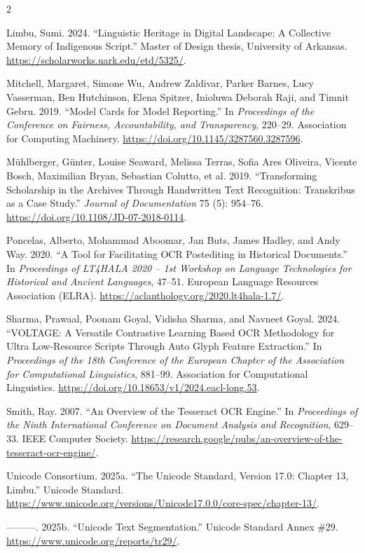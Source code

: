 \documentclass[
  10pt,
]{article}
\newlength{\cslhangindent}
\newenvironment{CSLReferences}[2] %
 {\begin{list}{}{%
  \setlength{\itemindent}{0pt}
  \setlength{\leftmargin}{0pt}
  \setlength{\parsep}{0pt}
  \ifodd #1
   \setlength{\leftmargin}{\cslhangindent}
   \setlength{\itemindent}{-1\cslhangindent}
  \fi
  \setlength{\itemsep}{#2\baselineskip}}}
 {\end{list}}
\begin{document}
\begin{multicols}{2}
\begin{CSLReferences}{1}{0}
Limbu, Sumi. 2024. {``Linguistic Heritage in Digital Landscape: A
Collective Memory of Indigenous Script.''} Master of Design thesis,
University of Arkansas. \url{https://scholarworks.uark.edu/etd/5325/}.

Mitchell, Margaret, Simone Wu, Andrew Zaldivar, Parker Barnes, Lucy
Vasserman, Ben Hutchinson, Elena Spitzer, Inioluwa Deborah Raji, and
Timnit Gebru. 2019. {``Model Cards for Model Reporting.''} In
\emph{Proceedings of the Conference on Fairness, Accountability, and
Transparency}, 220--29. Association for Computing Machinery.
\url{https://doi.org/10.1145/3287560.3287596}.

Mühlberger, Günter, Louise Seaward, Melissa Terras, Sofia Ares Oliveira,
Vicente Bosch, Maximilian Bryan, Sebastian Colutto, et al. 2019.
{``Transforming Scholarship in the Archives Through Handwritten Text
Recognition: Transkribus as a Case Study.''} \emph{Journal of
Documentation} 75 (5): 954--76.
\url{https://doi.org/10.1108/JD-07-2018-0114}.

Poncelas, Alberto, Mohammad Aboomar, Jan Buts, James Hadley, and Andy
Way. 2020. {``A Tool for Facilitating {OCR} Postediting in Historical
Documents.''} In \emph{Proceedings of LT4HALA 2020 -- 1st Workshop on
Language Technologies for Historical and Ancient Languages}, 47--51.
European Language Resources Association (ELRA).
\url{https://aclanthology.org/2020.lt4hala-1.7/}.

Sharma, Prawaal, Poonam Goyal, Vidisha Sharma, and Navneet Goyal. 2024.
{``{VOLTAGE}: A Versatile Contrastive Learning Based {OCR} Methodology
for Ultra Low-Resource Scripts Through Auto Glyph Feature Extraction.''}
In \emph{Proceedings of the 18th Conference of the European Chapter of
the Association for Computational Linguistics}, 881--99. Association for
Computational Linguistics.
\url{https://doi.org/10.18653/v1/2024.eacl-long.53}.

Smith, Ray. 2007. {``An Overview of the Tesseract OCR Engine.''} In
\emph{Proceedings of the Ninth International Conference on Document
Analysis and Recognition}, 629--33. IEEE Computer Society.
\url{https://research.google/pubs/an-overview-of-the-tesseract-ocr-engine/}.

Unicode Consortium. 2025a. {``The Unicode Standard, Version 17.0:
Chapter 13, Limbu.''} Unicode Standard.
\url{https://www.unicode.org/versions/Unicode17.0.0/core-spec/chapter-13/}.

---------. 2025b. {``Unicode Text Segmentation.''} Unicode Standard
Annex \#29. \url{https://www.unicode.org/reports/tr29/}.

\end{CSLReferences}

\end{multicols}
\end{document}
